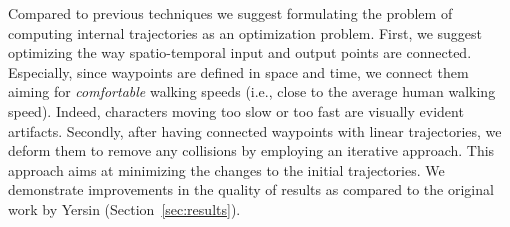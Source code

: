 Compared to previous techniques we suggest formulating the problem of computing internal trajectories as an optimization problem.
First, we suggest optimizing the way spatio-temporal input and output points are connected.
Especially, since waypoints are defined in space and time, we connect them aiming for {\it comfortable} walking speeds (i.e., close to the average human walking speed).
Indeed, characters moving too slow or too fast are visually evident artifacts.
Secondly, after having connected waypoints with linear trajectories, we deform them to remove any collisions by employing an iterative approach.
This approach aims at minimizing the changes to the initial trajectories.
We demonstrate improvements in the quality of results as compared to the original work by Yersin \etal (Section~\ref{sec:results}).


